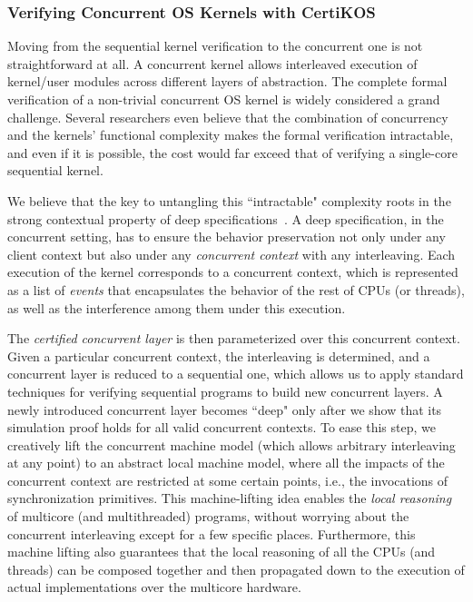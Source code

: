 \documentclass[a4paper, 10pt]{article}
\begin{document}
\begin{small}
\subsubsection*{\small Verifying Concurrent OS Kernels with CertiKOS}
Moving from the sequential kernel verification
to the concurrent one is not straightforward at all.
A concurrent kernel allows interleaved
execution of kernel/user modules across different
layers of abstraction. 
The complete formal verification of a non-trivial concurrent
OS kernel is widely considered a grand challenge. 
Several researchers even believe that the combination of concurrency and the kernels' functional complexity makes the formal verification intractable,
and even if it is possible, the cost would far exceed that of
verifying a single-core sequential kernel.

We believe that the key to untangling this ``intractable" complexity roots in the
strong contextual property of deep specifications~\cite{osdi16-gu}.
A deep specification, in the concurrent setting, has to ensure   the behavior preservation not only under any client context but also under
any \emph{concurrent context} with any interleaving.
Each execution of the kernel corresponds to a  concurrent context, which is represented as a list of \emph{events} that encapsulates the behavior of the rest of CPUs (or threads), as well as the interference
among them under this execution.

The \emph{certified concurrent layer}  is then parameterized over this concurrent context.
Given a particular concurrent context,
the interleaving is determined,
and a concurrent layer is reduced to a sequential one, which allows us to apply standard techniques for
verifying sequential programs to build new concurrent layers.
A newly introduced concurrent layer becomes ``deep" only after we show that its simulation proof holds for all valid concurrent contexts.
To ease this step, we creatively lift the concurrent machine model (which allows arbitrary interleaving at any point) to an abstract local machine model,
where all the impacts of the concurrent context are restricted at
some certain points, i.e.,
the invocations of synchronization primitives. This machine-lifting idea
enables the \emph{local reasoning} of multicore (and multithreaded) programs,
without worrying about the concurrent interleaving except for a few specific places. Furthermore, this machine lifting also guarantees that the local reasoning of all the
CPUs (and threads) can be composed together
and then 
propagated down to the execution of actual 
implementations over the  multicore hardware.


\end{small}
\end{document}
